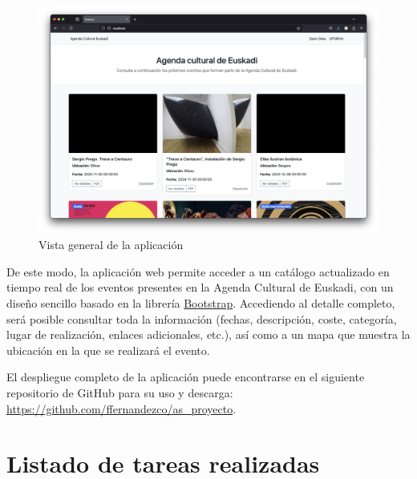 \documentclass{report}
\begin{document}
        \begin{figure}[H]
            \centering
            \includegraphics[width=0.8\linewidth]{img/general.png}
            \caption{Vista general de la aplicación}
            \label{fig:enter-label}
        \end{figure}

        De este modo, la aplicación web permite acceder a un catálogo actualizado en tiempo real de los eventos presentes en la Agenda Cultural de Euskadi, con un diseño sencillo basado en la librería \href{https://getbootstrap.com}{Bootstrap}. Accediendo al detalle completo, será posible consultar toda la información (fechas, descripción, coste, categoría, lugar de realización, enlaces adicionales, etc.), así como a un mapa que muestra la ubicación en la que se realizará el evento.

        El despliegue completo de la aplicación puede encontrarse en el siguiente repositorio de GitHub para su uso y descarga: \url{https://github.com/ffernandezco/as_proyecto}.

    \chapter{Listado de tareas realizadas}
\end{document}
